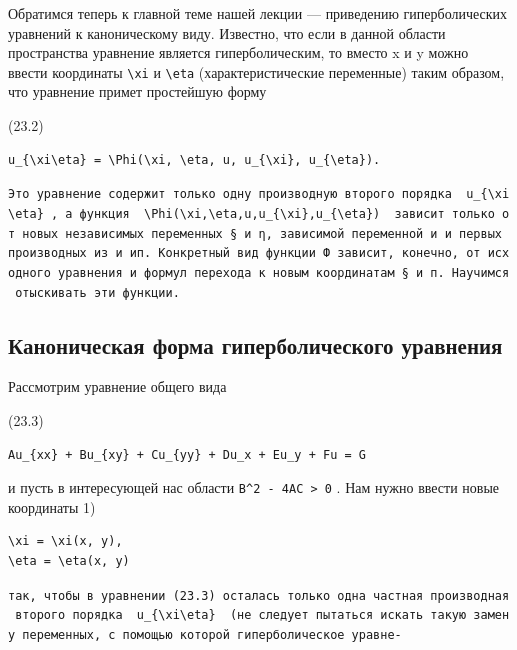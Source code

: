 \documentclass[
  ukrainian,
]{article}
\begin{document}
Обратимся теперь к главной теме нашей лекции --- приведению
гиперболических уравнений к каноническому виду. Известно, что если в
данной области пространства уравнение является гиперболическим, то
вместо x и y можно ввести координаты \texttt{\textbackslash{}xi} и
\texttt{\textbackslash{}eta} (характеристические переменные) таким
образом, что уравнение примет простейшую форму

(23.2)

\begin{verbatim}
u_{\xi\eta} = \Phi(\xi, \eta, u, u_{\xi}, u_{\eta}).
\end{verbatim}

\texttt{Это\ уравнение\ содержит\ только\ одну\ производную\ второго\ порядка\ \ \textquotesingle{}u\_\{\textbackslash{}xi\textbackslash{}eta\}\textquotesingle{}\ ,\ а\ функция\ \ \textquotesingle{}\textbackslash{}Phi(\textbackslash{}xi,\textbackslash{}eta,u,u\_\{\textbackslash{}xi\},u\_\{\textbackslash{}eta\})\textquotesingle{}\ \ зависит\ только\ от\ новых\ независимых\ переменных\ §\ и\ η,\ зависимой\ переменной\ и\ и\ первых\ производных\ из\ и\ ип.\ Конкретный\ вид\ функции\ Ф\ зависит,\ конечно,\ от\ исходного\ уравнения\ и\ формул\ перехода\ к\ новым\ координатам\ §\ и\ п.\ Научимся\ отыскивать\ эти\ функции.}

\subsection{Каноническая форма гиперболического
уравнения}\label{ux43aux430ux43dux43eux43dux438ux447ux435ux441ux43aux430ux44f-ux444ux43eux440ux43cux430-ux433ux438ux43fux435ux440ux431ux43eux43bux438ux447ux435ux441ux43aux43eux433ux43e-ux443ux440ux430ux432ux43dux435ux43dux438ux44f}

Рассмотрим уравнение общего вида

(23.3)

\begin{verbatim}
Au_{xx} + Bu_{xy} + Cu_{yy} + Du_x + Eu_y + Fu = G
\end{verbatim}

и пусть в интересующей нас области
\texttt{B\^{}2\ -\ 4AC\ \textgreater{}\ 0} . Нам нужно ввести новые
координаты 1)

\begin{verbatim}
\xi = \xi(x, y),
\eta = \eta(x, y)
\end{verbatim}

\texttt{так,\ чтобы\ в\ уравнении\ (23.3)\ осталась\ только\ одна\ частная\ производная\ второго\ порядка\ \ \textquotesingle{}u\_\{\textbackslash{}xi\textbackslash{}eta\}\textquotesingle{}\ \ (не\ следует\ пытаться\ искать\ такую\ замену\ переменных,\ с\ помощью\ которой\ гиперболическое\ уравне-}
\end{document}
